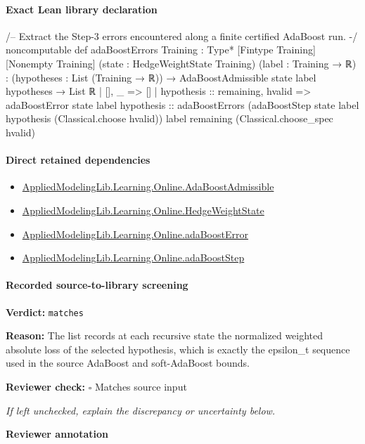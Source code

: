 \documentclass[10pt]{article}
\newcommand{\reviewerbox}{%
  \par\noindent\fbox{\parbox{0.96\linewidth}{\rule{0pt}{0.38in}}}\par
}
\newcommand{\reviewmatch}[1]{%
  \par\noindent\textbf{Reviewer check:} $\square$\; #1\par
  \noindent\emph{If left unchecked, explain the discrepancy or uncertainty below.}\par
}
\begin{document}
\paragraph{Exact Lean library declaration}
\begin{ReviewVerbatim}
/-- Extract the Step-3 errors encountered along a finite certified AdaBoost run. -/
noncomputable def adaBoostErrors
    {Training : Type*} [Fintype Training] [Nonempty Training]
    (state : HedgeWeightState Training) (label : Training → ℝ) :
    (hypotheses : List (Training → ℝ)) →
      AdaBoostAdmissible state label hypotheses → List ℝ
  | [], _ => []
  | hypothesis :: remaining, hvalid =>
      adaBoostError state label hypothesis ::
        adaBoostErrors
          (adaBoostStep state label hypothesis (Classical.choose hvalid)) label remaining
          (Classical.choose_spec hvalid)
\end{ReviewVerbatim}

\paragraph{Direct retained dependencies}
\begin{itemize}\raggedright
\item \hyperlink{library-prerequisite-2771987b29f636cf}{Applied\allowbreak{}Modeling\allowbreak{}Lib.\allowbreak{}Learning.\allowbreak{}Online.\allowbreak{}Ada\allowbreak{}Boost\allowbreak{}Admissible}
\item \hyperlink{library-prerequisite-8196082d02788389}{Applied\allowbreak{}Modeling\allowbreak{}Lib.\allowbreak{}Learning.\allowbreak{}Online.\allowbreak{}Hedge\allowbreak{}Weight\allowbreak{}State}
\item \hyperlink{governing-declaration-bd631eacbec4687c}{Applied\allowbreak{}Modeling\allowbreak{}Lib.\allowbreak{}Learning.\allowbreak{}Online.\allowbreak{}ada\allowbreak{}Boost\allowbreak{}Error}
\item \hyperlink{governing-declaration-ab9e0307acbbe7ff}{Applied\allowbreak{}Modeling\allowbreak{}Lib.\allowbreak{}Learning.\allowbreak{}Online.\allowbreak{}ada\allowbreak{}Boost\allowbreak{}Step}
\end{itemize}
\paragraph{Recorded source-to-library screening}
\textbf{Verdict:} \texttt{matches}
\\
{\raggedright
\textbf{Reason:} The list records at each recursive state the normalized weighted absolute loss of the selected hypothesis, which is exactly the epsilon\_\allowbreak{}t sequence used in the source AdaBoost and soft-\allowbreak{}AdaBoost bounds.\allowbreak{}
\par}
\reviewmatch{Matches source input}
\noindent\textbf{Reviewer annotation}\par
\reviewerbox
\clearpage
\hypertarget{library-prerequisite-3e4d395ab09bf43b}{}
\end{document}
